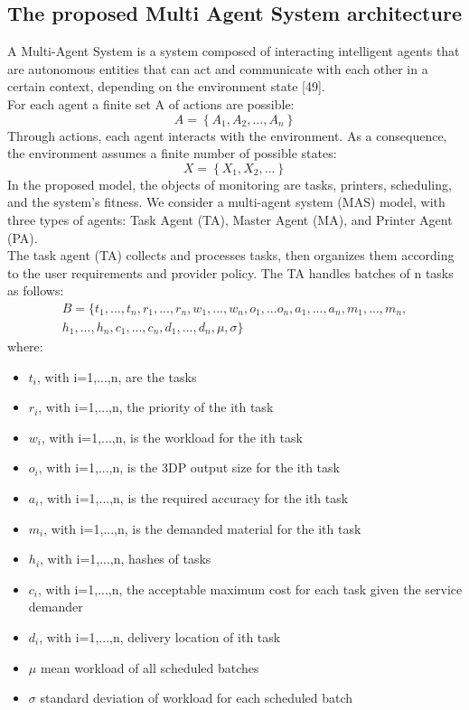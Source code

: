 \subsection{The proposed Multi Agent System architecture}
A Multi-Agent System is a system composed of interacting intelligent agents that are autonomous entities that can act and communicate with each other in a certain context, depending on the environment state [49].\\
For each agent a finite set A of actions are possible: \begin{equation} \label{eq:7} A = \left\{A_1,A_2,...,A_n\right\}\end{equation}
Through actions, each agent interacts with the environment. As a consequence, the environment assumes a finite number of possible states: \begin{equation} \label{eq:8} X = \left\{X_1, X_2, ...\right\} \end{equation}
In the proposed model, the objects of monitoring are tasks, printers, scheduling, and the system's fitness. We consider a multi-agent system (MAS) model, with three types of agents: Task Agent (TA), Master Agent (MA), and Printer Agent (PA).\\
The task agent (TA) collects and processes tasks, then organizes them according to the user requirements and provider policy. The TA handles batches of n tasks as follows:
\begin{multline}
    \label{eq:9}
    B=\{t_1,...,t_n,r_1,...,r_n,w_1,...,w_n,o_1,...o_n,a_1,...,a_n,m_1,...,m_n,\\ 
        h_1,...,h_n,c_1,...,c_n,d_1,...,d_n,\mu,\sigma\}
\end{multline}
where:
\begin{itemize}
    \item $t_i$, with i=1,...,n, are the tasks
    \item $r_i$, with i=1,...,n, the priority of the ith task
    \item $w_i$, with i=1,...,n, is the workload for the ith task
    \item $o_i$, with i=1,...,n, is the 3DP output size for the ith task
    \item $a_i$, with i=1,...,n, is the required accuracy for the ith task
    \item $m_i$, with i=1,...,n, is the demanded material for the ith task
    \item $h_i$, with i=1,...,n, hashes of tasks
    \item $c_i$, with i=1,...,n, the acceptable maximum cost for each task given the service demander
    \item $d_i$, with i=1,...,n, delivery location of ith task
    \item $\mu$ mean workload of all scheduled batches
    \item $\sigma$ standard deviation of workload for each scheduled batch
\end{itemize}


